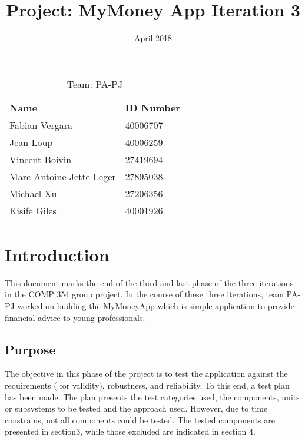 \documentclass{article}
\title{Project: MyMoney App \newline Iteration 3}
\author{ }
\date{April 2018}
\begin{document}
\maketitle

\vspace*{1.5in}
\begin{table}[htbp]

\begin{center}
\begin{tabular}{|l | l|}
\hline
Name & ID Number \\
\hline
Fabian Vergara & 40006707 \\
\hline

Jean-Loup  & 40006259 \\
\hline
Vincent Boivin & 27419694 \\

\hline
Marc-Antoine Jette-Leger & 27895038 \\
\hline
Michael Xu & 27206356 \\
\hline
Kisife Giles & 40001926 \\
\hline
\end{tabular}
\end{center}
\caption{Team: PA-PJ}
\label{table:1}
\end{table}


\newpage
\tableofcontents

\newpage

\section{Introduction}
This document marks the end of the third and last phase of the three iterations in the COMP 354 group project. In the course of these three iterations, team PA-PJ worked on building the MyMoneyApp which is simple application to provide financial advice to young professionals.

\subsection{Purpose}
The objective in this phase of the project is to test the application against the requirements ( for validity), robustness, and reliability.
To this end, a test plan has been made. The plan presents the test categories used, the components, units or subsystems to be tested and the approach used. However, due to time constrains, not all components could be tested. The tested components are presented in section3, while those excluded are indicated in section 4.
\end{document}
